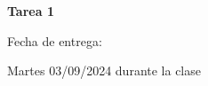\documentclass[10pt]{exam}
\begin{document}
\centering


\Large 
\textbf{Tarea 1}

\normalsize
Fecha de entrega: 

Martes 03/09/2024 durante la clase



\pointformat{\bfseries\boldmath(\thepoints)}
\vskip10pt



\end{document}
